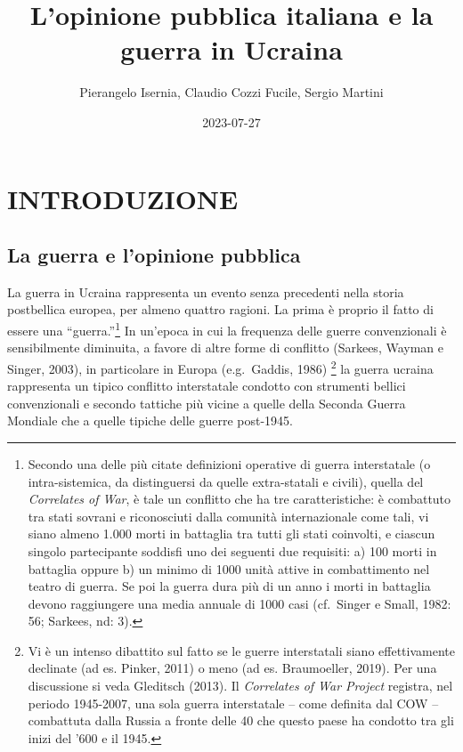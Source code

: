 \documentclass[
]{book}
\title{L'opinione pubblica italiana e la guerra in Ucraina}
\author{Pierangelo Isernia, Claudio Cozzi Fucile, Sergio Martini}
\date{2023-07-27}
\begin{document}
\maketitle

{
\setcounter{tocdepth}{1}
\tableofcontents
}
\hypertarget{introduzione}{%
\chapter{INTRODUZIONE}\label{introduzione}}

\hypertarget{la-guerra-e-lopinione-pubblica}{%
\section{La guerra e l'opinione pubblica}\label{la-guerra-e-lopinione-pubblica}}

La guerra in Ucraina rappresenta un evento senza precedenti nella storia postbellica europea, per almeno quattro ragioni. La prima è proprio il fatto di essere una ``guerra.''\footnote{Secondo una delle più citate definizioni operative di guerra interstatale (o intra-sistemica, da distinguersi da quelle extra-statali e civili), quella del \emph{Correlates of War}, è tale un conflitto che ha tre caratteristiche: è combattuto tra stati sovrani e riconosciuti dalla comunità internazionale come tali, vi siano almeno 1.000 morti in battaglia tra tutti gli stati coinvolti, e ciascun singolo partecipante soddisfi uno dei seguenti due requisiti: a) 100 morti in battaglia oppure b) un minimo di 1000 unità attive in combattimento nel teatro di guerra. Se poi la guerra dura più di un anno i morti in battaglia devono raggiungere una media annuale di 1000 casi (cf.~Singer e Small, 1982: 56; Sarkees, nd: 3).} In un'epoca in cui la frequenza delle guerre convenzionali è sensibilmente diminuita, a favore di altre forme di conflitto (Sarkees, Wayman e Singer, 2003), in particolare in Europa (e.g.~Gaddis, 1986) \footnote{Vi è un intenso dibattito sul fatto se le guerre interstatali siano effettivamente declinate (ad es. Pinker, 2011) o meno (ad es. Braumoeller, 2019). Per una discussione si veda Gleditsch (2013). Il \emph{Correlates of War Project} registra, nel periodo 1945-2007, una sola guerra interstatale -- come definita dal COW -- combattuta dalla Russia a fronte delle 40 che questo paese ha condotto tra gli inizi del '600 e il 1945.} la guerra ucraina rappresenta un tipico conflitto interstatale condotto con strumenti bellici convenzionali e secondo tattiche più vicine a quelle della Seconda Guerra Mondiale che a quelle tipiche delle guerre post-1945.
\end{document}
